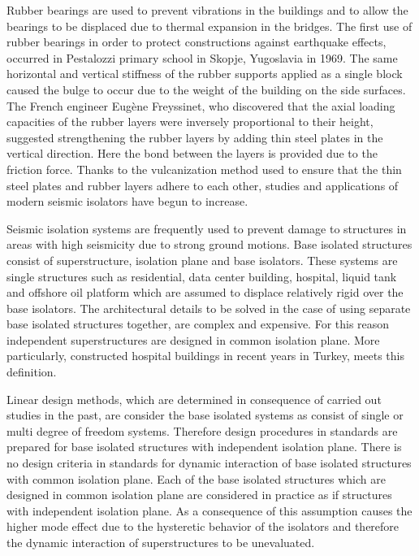 Rubber bearings are used to prevent vibrations in the buildings and
to allow the bearings to be displaced due to thermal expansion in
the bridges. The first use of rubber bearings in order to protect
constructions against earthquake effects, occurred in Pestalozzi primary
school in Skopje, Yugoslavia in 1969. The same horizontal and vertical
stiffness of the rubber supports applied as a single block caused
the bulge to occur due to the weight of the building on the side surfaces.
The French engineer Eugène Freyssinet, who discovered that the axial
loading capacities of the rubber layers were inversely proportional
to their height, suggested strengthening the rubber layers by adding
thin steel plates in the vertical direction. Here the bond between
the layers is provided due to the friction force. Thanks to the vulcanization
method used to ensure that the thin steel plates and rubber layers
adhere to each other, studies and applications of modern seismic isolators
have begun to increase.

Seismic isolation systems are frequently used to prevent damage to
structures in areas with high seismicity due to strong ground motions.
Base isolated structures consist of superstructure, isolation plane
and base isolators. These systems are single structures such as residential,
data center building, hospital, liquid tank and offshore oil platform
which are assumed to displace relatively rigid over the base isolators.
The architectural details to be solved in the case of using separate
base isolated structures together, are complex and expensive. For
this reason independent superstructures are designed in common isolation
plane. More particularly, constructed hospital buildings in recent
years in Turkey, meets this definition.

Linear design methods, which are determined in consequence of carried
out studies in the past, are consider the base isolated systems as
consist of single or multi degree of freedom systems. Therefore design
procedures in standards are prepared for base isolated structures
with independent isolation plane. There is no design criteria in standards
for dynamic interaction of base isolated structures with common isolation
plane. Each of the base isolated structures which are designed in
common isolation plane are considered in practice as if structures
with independent isolation plane. As a consequence of this assumption
causes the higher mode effect due to the hysteretic behavior of the
isolators and therefore the dynamic interaction of superstructures
to be unevaluated.

